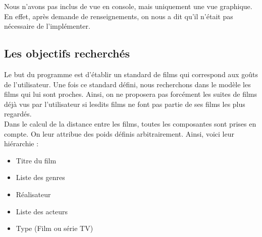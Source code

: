 Nous n'avons pas inclus de vue en console, mais uniquement une vue graphique. En effet, après demande de renseignements, on nous a dit qu'il n'était pas nécessaire de l'implémenter.

\subsection{Les objectifs recherchés}
Le but du programme est d'établir un standard de films qui correspond aux goûts de l'utilisateur. Une fois ce standard défini, nous recherchons dans le modèle les films qui lui sont proches. Ainsi, on ne proposera pas forcément les suites de films déjà vus par l'utilisateur si lesdits films ne font pas partie de ses films les plus regardés. \\
Dans le calcul de la distance entre les films, toutes les composantes sont prises en compte. On leur attribue des poids définis arbitrairement. Ainsi, voici leur hiérarchie :

\begin{itemize}
	\item Titre du film
	\item Liste des genres
	\item Réalisateur
	\item Liste des acteurs
	\item Type (Film ou série TV)
\end{itemize}

